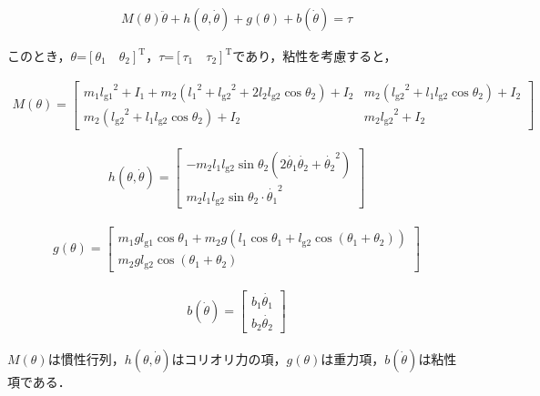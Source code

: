 \begin{eqnarray}
  M(\theta)\ddot{\theta} + h(\theta, \dot{\theta}) + g(\theta) + b(\dot{\theta}) = \tau
\end{eqnarray}

このとき，$\theta$=${[\theta_{1} \quad \theta_{2}]}^\mathrm{T}$，$\tau$=${[\tau_{1} \quad \tau_{2}]}^\mathrm{T}$であり，粘性を考慮すると，

\begin{align}
  M(\theta)= 
            \begin{bmatrix}
              m_{1}{l_{\mathrm{g1}}}^2 + I_{1} + m_{2}({l_{1}}^2 + {l_{\mathrm{g2}}}^2 + 2l_{2}l_{\mathrm{g2}}\cos\theta_{2}) + I_{2} & m_{2}({l_{\mathrm{g2}}}^2 + l_{1}l_{\mathrm{g2}}\cos\theta_{2}) + I_{2} \\
              m_{2}({l_{\mathrm{g2}}}^2 + l_{1}l_{\mathrm{g2}}\cos\theta_{2}) + I_{2} & m_{2}{l_{\mathrm{g2}}}^2 + I_{2}
            \end{bmatrix}
\end{align}

\begin{eqnarray}
  h(\theta, \dot{\theta})=
            \begin{bmatrix}
              -m_{2}l_{1}l_{\mathrm{g2}}\sin\theta_{2}(2\dot{\theta_{1}}\dot{\theta_{2}} + {\dot{\theta_{2}}}^2) \\
              m_{2}l_{1}l_{\mathrm{g2}}\sin\theta_{2}\cdot{\dot{\theta_{1}}}^2
            \end{bmatrix}
\end{eqnarray}

\begin{eqnarray}
  g(\theta)=
            \begin{bmatrix}
              m_{1}gl_{\mathrm{g1}}\cos\theta_{1} + m_{2}g(l_{1}\cos\theta_{1} + l_{\mathrm{g2}}\cos(\theta_{1} + \theta_{2})) \\
              m_{2}gl_{\mathrm{g2}}\cos(\theta_{1} + \theta_{2})
            \end{bmatrix}
\end{eqnarray}

\begin{eqnarray}
  b(\dot{\theta})=
            \begin{bmatrix}
              b_{1}\dot{\theta_{1}} \\
              b_{2}\dot{\theta_{2}}
            \end{bmatrix}
\end{eqnarray}

$M(\theta)$は慣性行列，$h(\theta, \dot{\theta})$はコリオリ力の項，$g(\theta)$は重力項，$b(\dot{\theta})$は粘性項である．


